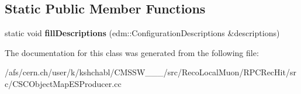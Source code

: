 \subsection*{Static Public Member Functions}
\begin{DoxyCompactItemize}
\item 
\hypertarget{classCSCObjectMapESProducer_abeefb78161c16c08a3b4c9a3a97c77e4}{static void {\bfseries fill\-Descriptions} (edm\-::\-Configuration\-Descriptions \&descriptions)}\label{classCSCObjectMapESProducer_abeefb78161c16c08a3b4c9a3a97c77e4}

\end{DoxyCompactItemize}


The documentation for this class was generated from the following file\-:\begin{DoxyCompactItemize}
\item 
/afs/cern.\-ch/user/k/kshchabl/\-C\-M\-S\-S\-W\-\_\-\_\-\_/src/\-Reco\-Local\-Muon/\-R\-P\-C\-Rec\-Hit/src/C\-S\-C\-Object\-Map\-E\-S\-Producer.\-cc\end{DoxyCompactItemize}

